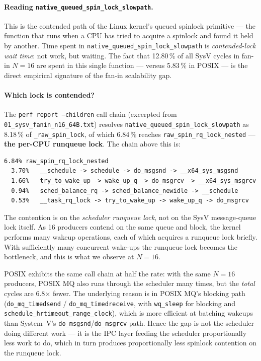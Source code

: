 \documentclass[a4paper,11pt]{article}
\begin{document}
\paragraph{Reading \texttt{native\_queued\_spin\_lock\_slowpath}.}
This is the contended path of the Linux kernel's queued spinlock
primitive --- the function that runs when a CPU has tried to acquire a
spinlock and found it held by another. Time spent in
\texttt{native\_queued\_spin\_lock\_slowpath} is \emph{contended-lock
wait time}: not work, but waiting. The fact that 12.80\,\% of all
SysV cycles in fan-in $N=16$ are spent in this single function ---
versus 5.83\,\% in POSIX --- is the direct empirical signature of the
fan-in scalability gap.

\paragraph{Which lock is contended?}
The \texttt{perf report --children} call chain (excerpted from
\texttt{01\_sysv\_fanin\_n16\_64B.txt}) resolves
\texttt{native\_queued\_spin\_lock\_slowpath} as 8.18\,\% of
\texttt{\_raw\_spin\_lock}, of which 6.84\,\% reaches
\texttt{raw\_spin\_rq\_lock\_nested} ---
\textbf{the per-CPU runqueue lock}. The chain above this is:

\begin{footnotesize}
\begin{verbatim}
6.84% raw_spin_rq_lock_nested
  3.70%   __schedule -> schedule -> do_msgsnd -> __x64_sys_msgsnd
  1.66%   try_to_wake_up -> wake_up_q -> do_msgrcv -> __x64_sys_msgrcv
  0.94%   sched_balance_rq -> sched_balance_newidle -> __schedule
  0.53%   __task_rq_lock -> try_to_wake_up -> wake_up_q -> do_msgrcv
\end{verbatim}
\end{footnotesize}

The contention is on the \emph{scheduler runqueue lock}, not on the
SysV message-queue lock itself. As 16 producers contend on the same
queue and block, the kernel performs many wakeup operations, each of
which acquires a runqueue lock briefly. With sufficiently many
concurrent wake-ups the runqueue lock becomes the bottleneck, and
this is what we observe at $N=16$.

POSIX exhibits the same call chain at half the rate: with the same
$N=16$ producers, POSIX MQ also runs through the scheduler many
times, but the \emph{total} cycles are 6.8$\times$ fewer. The
underlying reason is in POSIX MQ's blocking path
(\texttt{do\_mq\_timedsend} / \texttt{do\_mq\_timedreceive}, with
\texttt{wq\_sleep} for blocking and \texttt{schedule\_hrtimeout\_range\_clock}),
which is more efficient at batching wakeups than System~V's
\texttt{do\_msgsnd}/\texttt{do\_msgrcv} path. Hence the gap is not
the scheduler doing different work --- it is the IPC layer feeding
the scheduler proportionally less work to do, which in turn produces
proportionally less spinlock contention on the runqueue lock.
\end{document}
